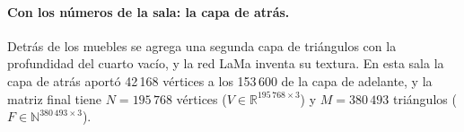 \paragraph{Con los números de la sala: la capa de atrás.} Detrás de los muebles se agrega una segunda capa de triángulos con la profundidad del cuarto vacío, y la
red LaMa inventa su textura. En esta sala la capa de atrás aportó 42\,168 vértices a los 153\,600 de la capa de adelante, y la matriz final tiene $N=195\,768$ vértices ($V\in\mathbb{R}^{195\,768\times3}$) y
$M=380\,493$ triángulos ($F\in\mathbb{N}^{380\,493\times3}$).
